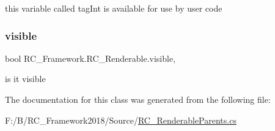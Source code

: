 this variable called tag\+Int is available for use by user code 

\mbox{\label{class_r_c___framework_1_1_r_c___renderable_a27490992e58f8295c86cd3ed1d79d937}} 
\subsubsection{\texorpdfstring{visible}{visible}}
{\footnotesize\ttfamily bool R\+C\+\_\+\+Framework.\+R\+C\+\_\+\+Renderable.\+visible\hspace{0.3cm}{\ttfamily [get]}, {\ttfamily [set]}}



is it visible 



The documentation for this class was generated from the following file\+:\begin{DoxyCompactItemize}
\item 
F\+:/\+B/\+R\+C\+\_\+\+Framework2018/\+Source/\mbox{\hyperlink{_r_c___renderable_parents_8cs}{R\+C\+\_\+\+Renderable\+Parents.\+cs}}\end{DoxyCompactItemize}
